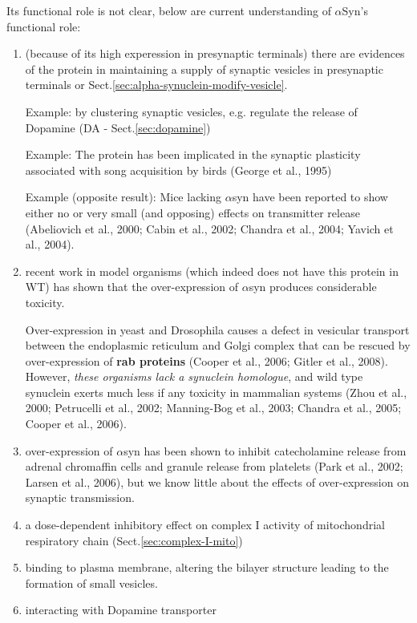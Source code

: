 Its functional role is not clear, below are current understanding of $\alpha$Syn's functional role:
\begin{enumerate}
  
  \item (because of its high experession in presynaptic terminals) there are
  evidences of the protein in maintaining  a supply of synaptic vesicles in
  presynaptic terminals   or Sect.\ref{sec:alpha-synuclein-modify-vesicle}.
  
  
  Example: by clustering synaptic vesicles, e.g. regulate the release of
  Dopamine (DA - Sect.\ref{sec:dopamine})
  
  Example: The protein has been implicated in the synaptic plasticity associated with
  song acquisition by birds (George et al., 1995)
  
  Example (opposite result): Mice lacking $\alpha$syn have been reported to show
  either no or very small (and opposing) effects on transmitter release
  (Abeliovich et al., 2000; Cabin et al., 2002; Chandra et al., 2004; Yavich et
  al., 2004).
  
  \item recent work in model organisms (which indeed does not have this protein
  in WT) has shown that the over-expression of $\alpha$syn produces considerable
  toxicity.
  
  Over-expression in yeast and Drosophila causes a defect in vesicular transport
  between the endoplasmic reticulum and Golgi complex that can be rescued by
  over-expression of {\bf rab proteins} (Cooper et al., 2006; Gitler et al.,
  2008).
  However, {\it these organisms lack a synuclein homologue}, and wild type
  synuclein exerts much less if any toxicity in mammalian systems (Zhou et al.,
  2000; Petrucelli et al., 2002; Manning-Bog et al., 2003; Chandra et al., 2005;
  Cooper et al., 2006).
  
  \item over-expression of $\alpha$syn has been shown to inhibit catecholamine release
  from adrenal chromaffin cells and granule release from platelets (Park et al.,
  2002; Larsen et al., 2006), but we know little about the effects of
  over-expression on synaptic transmission.
  
  \item a dose-dependent inhibitory effect on complex I activity of
  mitochondrial respiratory chain (Sect.\ref{sec:complex-I-mito})
  
  \item binding to plasma membrane, altering the bilayer structure leading to
  the formation of small vesicles.
  
  \item interacting with Dopamine transporter
\end{enumerate}

